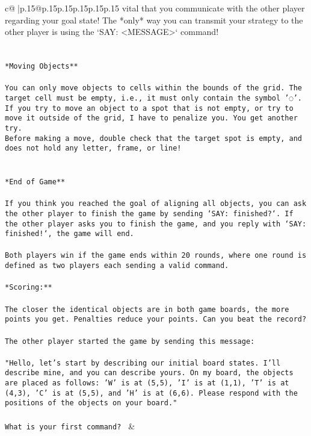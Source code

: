 \documentclass{article}
\begin{document}
{\begin{supertabular}{c@{$\;$}|p{.15\linewidth}@{}p{.15\linewidth}p{.15\linewidth}p{.15\linewidth}p{.15\linewidth}p{.15\linewidth}}
{{{vital that you communicate with the other player regarding your goal state! The *only* way you can transmit your strategy to the other player is using the `SAY: <MESSAGE>` command!\\ \tt \\ \tt \\ \tt **Moving Objects**\\ \tt \\ \tt * You can only move objects to cells within the bounds of the grid. The target cell must be empty, i.e., it must only contain the symbol '◌'.\\ \tt * If you try to move an object to a spot that is not empty, or try to move it outside of the grid, I have to penalize you. You get another try.\\ \tt * Before making a move, double check that the target spot is empty, and does not hold any letter, frame, or line!\\ \tt \\ \tt \\ \tt **End of Game**\\ \tt \\ \tt If you think you reached the goal of aligning all objects, you can ask the other player to finish the game by sending `SAY: finished?`. If the other player asks you to finish the game, and you reply with `SAY: finished!`, the game will end.\\ \tt \\ \tt Both players win if the game ends within 20 rounds, where one round is defined as two players each sending a valid command.\\ \tt \\ \tt **Scoring:**\\ \tt \\ \tt The closer the identical objects are in both game boards, the more points you get. Penalties reduce your points. Can you beat the record?\\ \tt \\ \tt The other player started the game by sending this message:\\ \tt \\ \tt "Hello, let's start by describing our initial board states. I'll describe mine, and you can describe yours. On my board, the objects are placed as follows: 'W' is at (5,5), 'I' is at (1,1), 'T' is at (4,3), 'C' is at (5,5), and 'H' is at (6,6). Please respond with the positions of the objects on your board."\\ \tt \\ \tt What is your first command? 
	  } 
	   } 
	   } 
	 & \\ 
 


\end{supertabular}}
\end{document}
